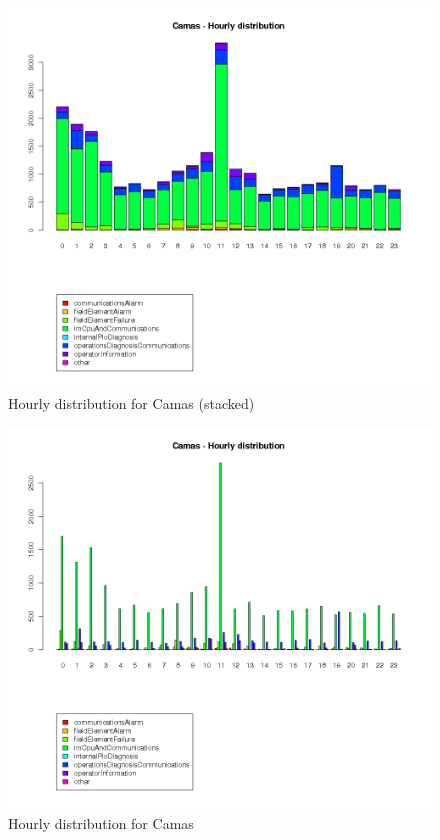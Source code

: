 \documentclass[a4paper,10pt]{article}
\begin{document}
\begin{figure}[h!]
 \centering
 \includegraphics[height=0.4\textheight]{./img/camas_timeline.png}
 \caption{Hourly distribution for Camas (stacked)}
\end{figure}
\begin{figure}[h!]
 \centering
 \includegraphics[height=0.4\textheight]{./img/camas_timeline_b.png}
 \caption{Hourly distribution for Camas}
\end{figure}
\end{document}
